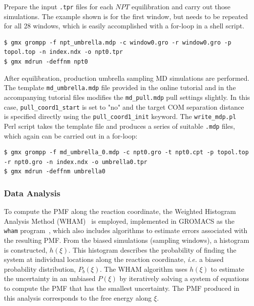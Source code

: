 \documentclass[9pt,tutorial,pubversion]{livecoms}
\begin{document}
Prepare the input \texttt{.tpr} files for each $NPT$ equilibration and carry out those simulations. The example shown is for the first window, but needs to be repeated for all 28 windows, which is easily accomplished with a for-loop in a shell script.

\begin{lstlisting}
$ gmx grompp -f npt_umbrella.mdp -c window0.gro -r window0.gro -p topol.top -n index.ndx -o npt0.tpr
$ gmx mdrun -deffnm npt0
\end{lstlisting}

After equilibration, production umbrella sampling MD simulations are performed. The template \texttt{md\_umbrella.mdp} file provided in the online tutorial and in the accompanying tutorial files modifies the \texttt{md\_pull.mdp} pull settings slightly. In this case, \texttt{pull\_coord1\_start} is set to "no" and the target COM separation distance is specified directly using the \texttt{pull\_coord1\_init} keyword. The \texttt{write\_mdp.pl} Perl script takes the template file and produces a series of suitable \texttt{.mdp} files, which again can be carried out in a for-loop:

\begin{lstlisting}
$ gmx grompp -f md_umbrella_0.mdp -c npt0.gro -t npt0.cpt -p topol.top -r npt0.gro -n index.ndx -o umbrella0.tpr
$ gmx mdrun -deffnm umbrella0
\end{lstlisting}

\subsubsection{Data Analysis} \label{umbrella_analysis}

To compute the PMF along the reaction coordinate, the Weighted Histogram Analysis Method (WHAM)~\cite{Kumar1992} is employed, implemented in GROMACS as the \texttt{wham} program~\cite{Hub2010}, which also includes algorithms to estimate errors associated with the resulting PMF. From the biased simulations (sampling windows), a histogram is constructed, $h(\xi)$. This histogram describes the probability of finding the system at individual locations along the reaction coordinate, {\em i.e.} a biased probability distribution, $P_b(\xi)$. The WHAM algorithm uses $h(\xi)$ to estimate the uncertainty in an unbiased $P(\xi)$ by iteratively solving a system of equations to compute the PMF that has the smallest uncertainty. The PMF produced in this analysis corresponds to the free energy along $\xi$.
\end{document}
